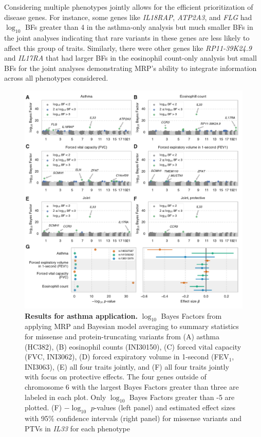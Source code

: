 Considering multiple phenotypes jointly allows for the efficient prioritization of disease genes. For instance, some genes like \textit{IL18RAP}, \textit{ATP2A3}, and \textit{FLG} had $\log_{10}$ BFs greater than 4 in the asthma-only analysis but much smaller BFs in the joint analyses indicating that rare variants in these genes are less likely to affect this group of traits. Similarly, there were other genes like \textit{RP11-39K24.9} and \textit{IL17RA} that had larger BFs in the eosinophil count-only analysis but small BFs for the joint analyses demonstrating MRP's ability to integrate information across all phenotypes considered.

\begin{figure}[!h]
\includegraphics[width=\textwidth]{../figures/final/Figure_03.pdf}
\caption{{\bf Results for asthma application.}
$\log_{10}$ Bayes Factors from applying MRP and Bayesian model averaging to summary statistics for missense and protein-truncating variants from (A) asthma (HC382), (B) eosinophil counts (INI30150), (C) forced vital capacity (FVC, INI3062), (D) forced expiratory volume in 1-second (FEV$_1$, INI3063), (E) all four traits jointly, and (F) all four traits jointly with focus on protective effects. The four genes outside of chromosome 6 with the largest Bayes Factors greater than three are labeled in each plot. Only $\log_{10}$ Bayes Factors greater than -5 are plotted. (F) $-\log_{10}$ $p$-values (left panel) and estimated effect sizes with 95\% confidence intervals (right panel) for missense variants and PTVs in \textit{IL33} for each phenotype}
\label{asthma_bma}
\end{figure}

